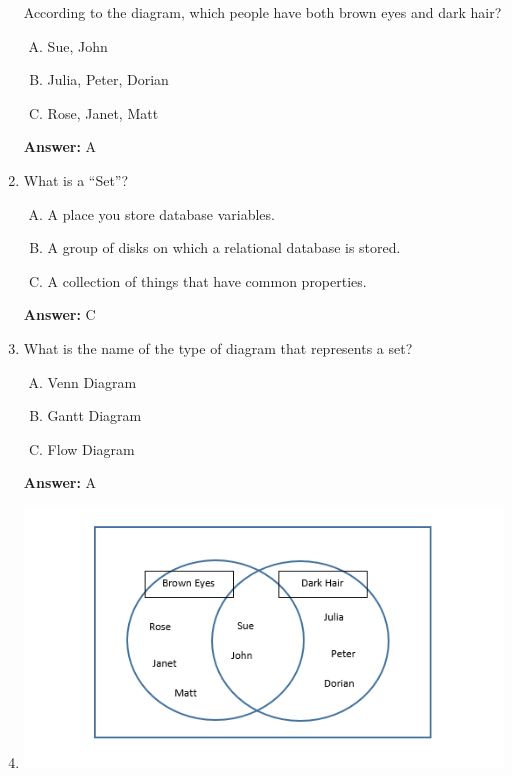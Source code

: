 \documentclass[12pt]{article}
\begin{document}
\begin{enumerate}[1.]
    \bigskip

    According to the diagram, which people have both brown eyes and dark hair?

    \bigskip

    \begin{enumerate}[A.]
        \item Sue, John
        \item Julia, Peter, Dorian
        \item Rose, Janet, Matt
    \end{enumerate}

    \bigskip

    \textbf{Answer:} A


    \item

    What is a ``Set''?

    \bigskip

    \begin{enumerate}[A.]
        \item A place you store database variables.
        \item A group of disks on which a relational database is stored.
        \item A collection of things that have common properties.
    \end{enumerate}

    \bigskip

    \textbf{Answer:} C


    \item

    What is the name of the type of diagram that represents a set?

    \bigskip

    \begin{enumerate}[A.]
        \item Venn Diagram
        \item Gantt Diagram
        \item Flow Diagram
    \end{enumerate}

    \bigskip

    \textbf{Answer:} A

    \item

    \begin{center}
    \includegraphics[width=0.8\linewidth]{images/part_1_notes_5.png}
    \end{center}


\end{enumerate}
\end{document}
